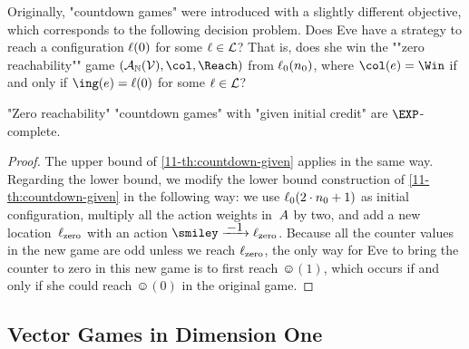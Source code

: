 \medskip
Originally, "countdown games" were introduced with a slightly
different objective, which corresponds to the following decision
problem.
\AP{}
  {Does Eve have a strategy to reach a configuration $\ell(0)$ for
  some $\ell\in\mathcal L$?
  That is, does she win the ""zero reachability""
  game $(\?A_\+N(\?V),\col,\Reach)$ from $\ell_0(n_0)$, where
  $\col(e)=\Win$ if and only if $\ing(e)=\loc(0)$ for some $\ell\in\mathcal L$?}
\begin{theorem}
\label{11-th:countdown-zero}
  "Zero reachability" "countdown games" with "given initial credit"
  are $\EXP$-complete.
\end{theorem}
\begin{proof}
  The upper bound of \cref{11-th:countdown-given} applies in the same
  way.  Regarding the lower bound, we modify the lower bound
  construction of \cref{11-th:countdown-given} in the following way: we
  use $\ell_0(2\cdot n_0+1)$ as initial configuration, multiply all
  the action weights in~$A$ by two, and add a new
  location~$\ell_\mathrm{zero}$ with an action
  $\smiley\step{-1}\loc_\mathrm{zero}$.  Because all the counter
  values in the new game are odd unless we reach $\ell_\mathrm{zero}$,
  the only way for Eve to bring the counter to zero in this new game
  is to first reach $\smiley(1)$, which occurs if and only if she
  could reach $\smiley(0)$ in the original game.
\end{proof}

\subsection{Vector Games in Dimension One}
\label{11-sec:one-counter}

